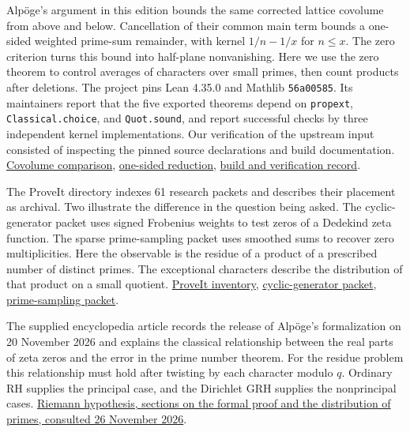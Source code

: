 \documentclass[11pt]{article}
\begin{document}
Alpöge's argument in this edition bounds the same corrected lattice
covolume from above and below.  Cancellation of their common main term
bounds a one-sided weighted prime-sum remainder, with kernel $1/n-1/x$
for $n\le x$.  The zero criterion turns this bound into half-plane
nonvanishing.  Here we use the zero theorem
to control averages of characters over small primes, then count products
after deletions.  The project pins Lean 4.35.0 and Mathlib
\texttt{56a00585}.  Its maintainers report that the five exported theorems
depend on \texttt{propext}, \texttt{Classical.choice}, and
\texttt{Quot.sound}, and report successful checks by three independent
kernel implementations.  Our verification of the upstream input consisted
of inspecting the pinned source declarations and build documentation.
\href{https://github.com/lsernau/grh-lean/blob/72fead102f663d5c7a407964a13dc0cf9d977207/grh/src/New/Reduction/MainInequality.lean}{Covolume comparison},
\href{https://github.com/lsernau/grh-lean/blob/72fead102f663d5c7a407964a13dc0cf9d977207/grh/src/New/Reduction/OneSidedBound.lean}{one-sided reduction},
\href{https://github.com/lsernau/grh-lean/blob/72fead102f663d5c7a407964a13dc0cf9d977207/grh/README.md}{build and verification record}.

The ProveIt directory indexes 61 research packets and describes their
placement as archival.  Two illustrate the difference in the question
being asked.  The cyclic-generator packet uses signed Frobenius weights
to test zeros of a Dedekind zeta function.  The sparse prime-sampling
packet uses smoothed sums to recover zero multiplicities.  Here the
observable is the residue of a product of a prescribed number of distinct
primes.  The exceptional characters describe the distribution of that
product on a small quotient.
\href{https://github.com/VladimirReshetnikov/ProveIt/blob/4d7990202f9f106b2ffe8c209f073ad01d5e1987/Analysis/GeneralizedRiemannHypothesis/README.md}{ProveIt inventory},
\href{https://github.com/VladimirReshetnikov/ProveIt/blob/4d7990202f9f106b2ffe8c209f073ad01d5e1987/Analysis/GeneralizedRiemannHypothesis/Research/grh_cyclic_generator_transfer_2026-11-25/README.md}{cyclic-generator packet},
\href{https://github.com/VladimirReshetnikov/ProveIt/blob/4d7990202f9f106b2ffe8c209f073ad01d5e1987/Analysis/GeneralizedRiemannHypothesis/Research/grh-torsion-and-prime-sampling/README.md}{prime-sampling packet}.

The supplied encyclopedia article records the release of Alpöge's
formalization on 20 November 2026 and explains the classical relationship
between the real parts of zeta zeros and the error in the prime number
theorem.  For the residue problem this relationship must hold after
twisting by each character modulo $q$.  Ordinary RH supplies the principal
case, and the Dirichlet GRH supplies the nonprincipal cases.
\href{https://en.wikipedia.org/wiki/Riemann_hypothesis}{Riemann hypothesis,
sections on the formal proof and the distribution of primes, consulted
26 November 2026}.
\end{document}
